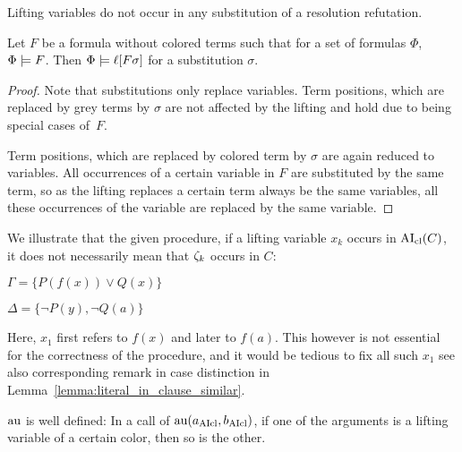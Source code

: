 \documentclass[,%
	paper=a4,%
	DIV14, %
	twoside=false,%
	liststotoc,
	bibtotoc,
	draft=false,%
	numbers=noendperiod
]{scrartcl}
\begin{document}
\begin{lemma}
	\label{lemma:no_lifting_vars_in_subst}
	Lifting variables do not occur in any substitution of a resolution refutation.
\end{lemma}

\begin{lemma}
	\label{lemma:substitute_and_lift}
	Let $F$ be a formula without colored terms such that for a set of formulas $\Phi$, $\Phi \models F$.
	Then $\Phi \models \ell[F\sigma]$ for a substitution $\sigma$.
\end{lemma}
\begin{proof}
	Note that substitutions only replace variables. Term positions, which are replaced by grey terms by $\sigma$ are not affected by the lifting and hold due to being special cases of~$F$.

	Term positions, which are replaced by colored term by $\sigma$ are again reduced to variables.
	All occurrences of a certain variable in $F$ are substituted by the same term, so as the lifting replaces a certain term always be the same variables, all these occurrences of the variable are replaced by the same variable.
\end{proof}

\begin{exa} 
	\label{exa:lifting_var_refers_to_different_term}
	We illustrate that the given procedure, if a lifting variable $x_k$ occurs in $\operatorname{AI}_\mathrm{cl}(C)$, it does not necessarily mean that $\zeta_{k}$ occurs in $C$:

	$\Gamma = \{P(f(x))\lor Q(x)\}$

	$\Delta = \{\lnot P(y), \lnot Q(a)\}$
	\begin{prooftree}



	\end{prooftree}
	Here, $x_1$ first refers to $f(x)$ and later to $f(a)$.
	This however is not essential for the correctness of the procedure, and it would be tedious to fix all such $x_1$ see also corresponding remark in case distinction in Lemma~\ref{lemma:literal_in_clause_similar}.
\end{exa} 

			\begin{conj}
				$\operatorname{au}$ is well defined:
				In a call of $\operatorname{au}(a_{\operatorname{AIcl}}, b_{\operatorname{AIcl}})$, if one of the arguments is a lifting variable of a certain color, then so is the other.
			\end{conj}
\end{document}
